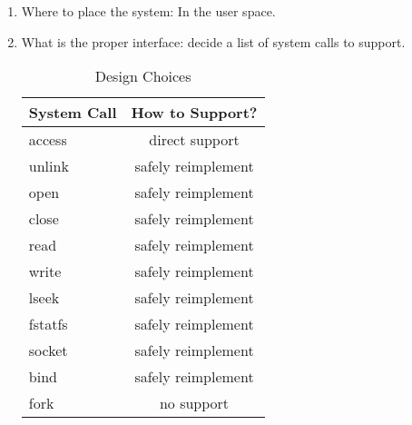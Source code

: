 \begin{enumerate}
\item Where to place the system: In the user space. 
\item What is the proper interface: decide a list of system calls to support.

\begin{table}[ht]
\centering
\begin{tabular}{|l|c|}
  \hline
  System Call & How to Support? \\
  \hline \hline
  access & direct support \\
  \hline
  unlink & safely reimplement \\
  \hline
  open & safely reimplement \\
  \hline
  close & safely reimplement \\
  \hline
  read & safely reimplement \\
  \hline
  write & safely reimplement \\
  \hline
  lseek & safely reimplement \\
  \hline
  fstatfs& safely reimplement \\
  \hline
  socket & safely reimplement \\
  \hline
  bind & safely reimplement \\
  \hline
  fork & no support \\
  \hline
\end{tabular}
\caption {Design Choices}
\label{table:design_choices}
\end{table}

\end{enumerate}
